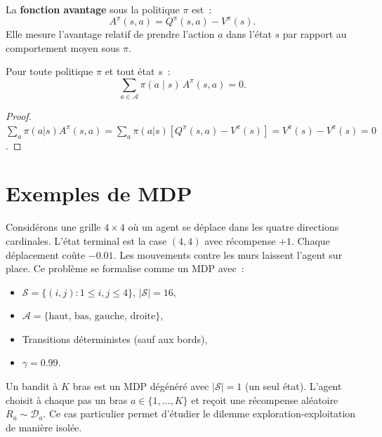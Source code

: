 \begin{definition}
La \textbf{fonction avantage} sous la politique $\pi$ est~:
\[
    A^\pi(s, a) = Q^\pi(s, a) - V^\pi(s).
\]
Elle mesure l'avantage relatif de prendre l'action $a$ dans l'\'etat $s$
par rapport au comportement moyen sous $\pi$.
\end{definition}

\begin{proposition}
Pour toute politique $\pi$ et tout \'etat $s$~:
\[
    \sum_{a \in \mathcal{A}} \pi(a \mid s) \, A^\pi(s, a) = 0.
\]
\end{proposition}

\begin{proof}
$\sum_a \pi(a|s) A^\pi(s,a) = \sum_a \pi(a|s)[Q^\pi(s,a) - V^\pi(s)]
= V^\pi(s) - V^\pi(s) = 0$.
\end{proof}

\section{Exemples de MDP}

\begin{exemple}[Gridworld]
Consid\'erons une grille $4 \times 4$ o\`u un agent se d\'eplace dans les quatre
directions cardinales. L'\'etat terminal est la case $(4,4)$ avec r\'ecompense $+1$.
Chaque d\'eplacement co\^ute $-0.01$. Les mouvements contre les murs laissent
l'agent sur place. Ce probl\`eme se formalise comme un MDP avec~:
\begin{itemize}
    \item $\mathcal{S} = \{(i,j) : 1 \leq i,j \leq 4\}$, $|\mathcal{S}| = 16$,
    \item $\mathcal{A} = \{\text{haut, bas, gauche, droite}\}$,
    \item Transitions d\'eterministes (sauf aux bords),
    \item $\gamma = 0.99$.
\end{itemize}
\end{exemple}

\begin{exemple}
Un bandit \`a $K$ bras est un MDP d\'eg\'en\'er\'e avec $|\mathcal{S}| = 1$
(un seul \'etat). L'agent choisit \`a chaque pas un bras $a \in \{1, \ldots, K\}$
et re\c{c}oit une r\'ecompense al\'eatoire $R_a \sim \mathcal{D}_a$. Ce cas
particulier permet d'\'etudier le dilemme exploration-exploitation de mani\`ere
isol\'ee.
\end{exemple}

